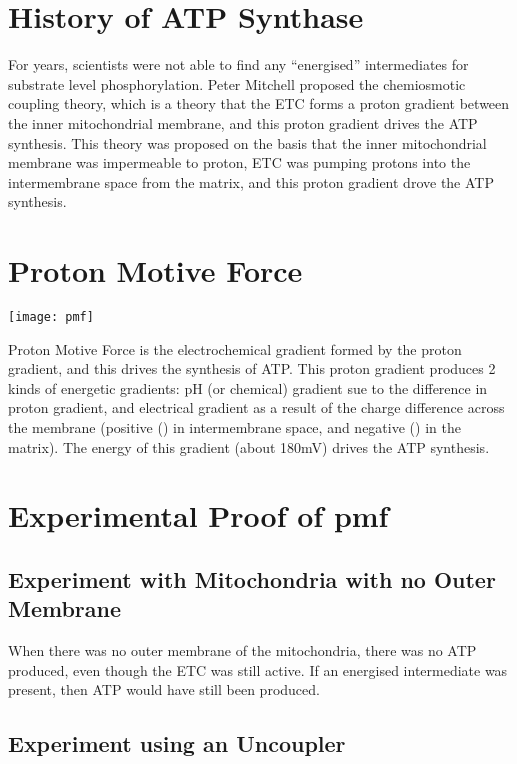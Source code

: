 \section{History of ATP Synthase}

For years, scientists were not able to find any ``energised'' intermediates for substrate level phosphorylation.
Peter Mitchell proposed the chemiosmotic coupling theory, which is a theory that the ETC forms a proton gradient between the inner mitochondrial membrane, and this proton gradient drives the ATP synthesis.
This theory was proposed on the basis that the inner mitochondrial membrane was impermeable to proton, ETC was pumping protons into the intermembrane space from the matrix, and this proton gradient drove the ATP synthesis.

\section{Proton Motive Force}

\begin{center}
\texttt{[image: pmf]}
\end{center}

Proton Motive Force is the electrochemical gradient formed by the proton gradient, and this drives the synthesis of ATP.
This proton gradient produces 2 kinds of energetic gradients: pH (or chemical) gradient sue to the difference in proton gradient, and electrical gradient as a result of the charge difference across the membrane (positive () in intermembrane space, and negative () in the matrix).
The energy of this gradient (about 180mV) drives the ATP synthesis.

\section{Experimental Proof of pmf}

\subsection{Experiment with Mitochondria with no Outer Membrane}

When there was no outer membrane of the mitochondria, there was no ATP produced, even though the ETC was still active.
If an energised intermediate was present, then ATP would have still been produced.

\subsection{Experiment using an Uncoupler}

